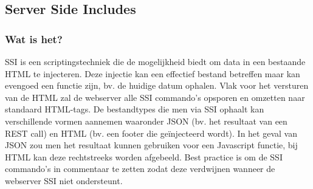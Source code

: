 \documentclass{article}
\begin{document}
	\subsection{Server Side Includes} 
	\subsubsection{Wat is het?}
	SSI is een scriptingstechniek die de mogelijkheid biedt om data in een bestaande HTML te injecteren. Deze injectie kan een effectief bestand betreffen maar kan evengoed een functie zijn, bv. de huidige datum ophalen. Vlak voor het versturen van de HTML zal de webserver alle SSI commando's opsporen en omzetten naar standaard HTML-tags. De bestandtypes die men via SSI ophaalt kan verschillende vormen aannemen waaronder JSON (bv. het resultaat van een REST call) en HTML (bv. een footer die ge\"injecteerd wordt). In het geval van JSON zou men het resultaat kunnen gebruiken voor een Javascript functie, bij HTML kan deze rechtstreeks worden afgebeeld. Best practice is om de SSI commando's in commentaar te zetten zodat deze verdwijnen wanneer de webserver SSI niet ondersteunt.
\end{document}
